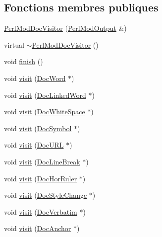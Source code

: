 \subsection*{Fonctions membres publiques}
\begin{DoxyCompactItemize}
\item 
\hyperlink{class_perl_mod_doc_visitor_a147c750cdb85c41305baf5ccb8dca305}{Perl\+Mod\+Doc\+Visitor} (\hyperlink{class_perl_mod_output}{Perl\+Mod\+Output} \&)
\item 
virtual \hyperlink{class_perl_mod_doc_visitor_a22fa37c6d082c47367af9414623b52eb}{$\sim$\+Perl\+Mod\+Doc\+Visitor} ()
\item 
void \hyperlink{class_perl_mod_doc_visitor_a1766bc0c0c37524f9fac777d62526f59}{finish} ()
\item 
void \hyperlink{class_perl_mod_doc_visitor_a02f8554a8a51420323e77d058881e51f}{visit} (\hyperlink{class_doc_word}{Doc\+Word} $\ast$)
\item 
void \hyperlink{class_perl_mod_doc_visitor_aa80e542bb624ba60a569218362092fa7}{visit} (\hyperlink{class_doc_linked_word}{Doc\+Linked\+Word} $\ast$)
\item 
void \hyperlink{class_perl_mod_doc_visitor_a2c322edff264290a6e57bfa031e77cd2}{visit} (\hyperlink{class_doc_white_space}{Doc\+White\+Space} $\ast$)
\item 
void \hyperlink{class_perl_mod_doc_visitor_a27daa7ca4f2c3ab2a3b220633f56c57d}{visit} (\hyperlink{class_doc_symbol}{Doc\+Symbol} $\ast$)
\item 
void \hyperlink{class_perl_mod_doc_visitor_a623b819a61e860178970bf5620646fb5}{visit} (\hyperlink{class_doc_u_r_l}{Doc\+U\+R\+L} $\ast$)
\item 
void \hyperlink{class_perl_mod_doc_visitor_a456d3d1d5b0733055f70d744c6394729}{visit} (\hyperlink{class_doc_line_break}{Doc\+Line\+Break} $\ast$)
\item 
void \hyperlink{class_perl_mod_doc_visitor_a1c19e22797c0f3262fdf47485f6c9596}{visit} (\hyperlink{class_doc_hor_ruler}{Doc\+Hor\+Ruler} $\ast$)
\item 
void \hyperlink{class_perl_mod_doc_visitor_a70159e6b7bfd4231bdec8acc67c83839}{visit} (\hyperlink{class_doc_style_change}{Doc\+Style\+Change} $\ast$)
\item 
void \hyperlink{class_perl_mod_doc_visitor_a233b1e47ed105234259eed1cfd6990ee}{visit} (\hyperlink{class_doc_verbatim}{Doc\+Verbatim} $\ast$)
\item 
void \hyperlink{class_perl_mod_doc_visitor_a38fbfd1716fd80978b53f88dd53edc46}{visit} (\hyperlink{class_doc_anchor}{Doc\+Anchor} $\ast$)

\end{DoxyCompactItemize}

